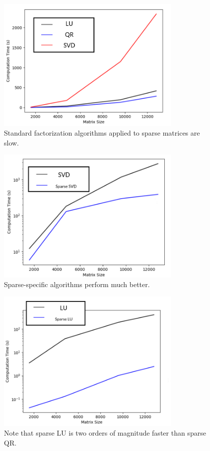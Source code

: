 \documentclass[10pt]{article}
\begin{document}
\begin{multicols}{2}
\begin{figure}[H]
	\centering
	\includegraphics[width=3.5in]{img/comp.png}
	\caption{Standard factorization algorithms applied to sparse matrices are slow.}
\end{figure}
\begin{figure}[H]
	\centering
	\includegraphics[width=3.5in]{img/spsvd.png}
	\caption{Sparse-specific algorithms perform much better.}
\end{figure}
\begin{figure}[H]
	\centering
	\includegraphics[width=3.5in]{img/splu.png}
	\caption{Note that sparse LU is two orders of magnitude faster than sparse QR.}
\end{figure}


\end{multicols}
\end{document}
